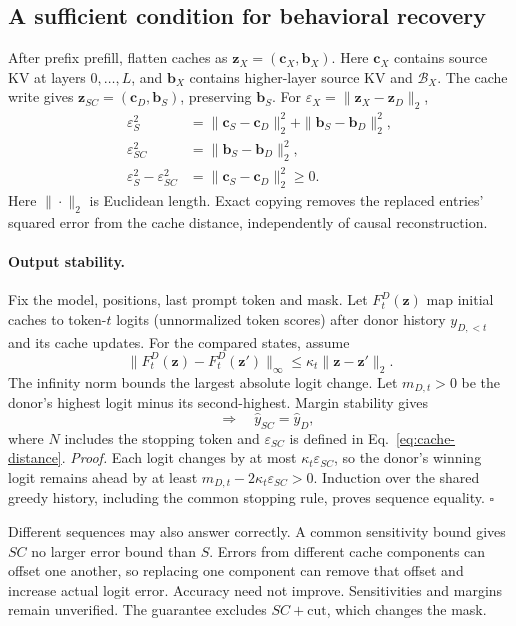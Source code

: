 \subsection{A sufficient condition for behavioral recovery}
\label{app:behavior-recovery}

After prefix prefill, flatten caches as $\mathbf z_X=(\mathbf c_X,\mathbf b_X)$.
Here $\mathbf c_X$ contains source KV at layers $0,\ldots,L$, and
$\mathbf b_X$ contains higher-layer source KV and $\mathcal B_X$.
The cache write gives $\mathbf z_{SC}=(\mathbf c_D,\mathbf b_S)$,
preserving $\mathbf b_S$. For $\varepsilon_X=\|\mathbf z_X-\mathbf z_D\|_2$,
\begin{equation}
\begin{aligned}
\varepsilon_S^2
 &=\|\mathbf c_S-\mathbf c_D\|_2^2+\|\mathbf b_S-\mathbf b_D\|_2^2,\\
\varepsilon_{SC}^2&=\|\mathbf b_S-\mathbf b_D\|_2^2,\\
\varepsilon_S^2-\varepsilon_{SC}^2
 &=\|\mathbf c_S-\mathbf c_D\|_2^2\ge0.
\end{aligned}
\label{eq:cache-distance}
\end{equation}
Here $\|\cdot\|_2$ is Euclidean length. Exact copying removes the replaced
entries' squared error from the cache distance, independently of causal
reconstruction.

\paragraph{Output stability.}
Fix the model, positions, last prompt token and mask. Let $F_t^D(\mathbf z)$
map initial caches to token-$t$ logits (unnormalized token scores) after
donor history $y_{D,<t}$ and its cache updates. For the compared states, assume
\begin{equation}
\|F_t^D(\mathbf z)-F_t^D(\mathbf z')\|_\infty
\le\kappa_t\|\mathbf z-\mathbf z'\|_2.
\label{eq:cache-lipschitz}
\end{equation}
The infinity norm bounds the largest absolute logit change. Let
$m_{D,t}>0$ be the donor's highest logit minus its second-highest.
Margin stability \citep{tsuzuku2018lipschitz} gives
\begin{equation}
[\ \forall t\le N:\ 2\kappa_t\varepsilon_{SC}<m_{D,t}\ ]
\quad\Longrightarrow\quad \hat y_{SC}=\hat y_D,
\label{eq:sequence-recovery}
\end{equation}
where $N$ includes the stopping token and $\varepsilon_{SC}$ is defined
in Eq.~\eqref{eq:cache-distance}.
\emph{Proof.} Each logit changes by at most $\kappa_t\varepsilon_{SC}$,
so the donor's winning logit remains ahead by at least
$m_{D,t}-2\kappa_t\varepsilon_{SC}>0$. Induction over the shared greedy
history, including the common stopping rule, proves sequence equality.
\hfill$\square$

Different sequences may also answer correctly. A common sensitivity bound
gives $SC$ no larger error bound than $S$. Errors from different cache
components can offset one another, so replacing one component can remove
that offset and increase actual logit error. Accuracy need not improve. Sensitivities and
margins remain unverified. The guarantee excludes $SC+\mathrm{cut}$,
which changes the mask.
